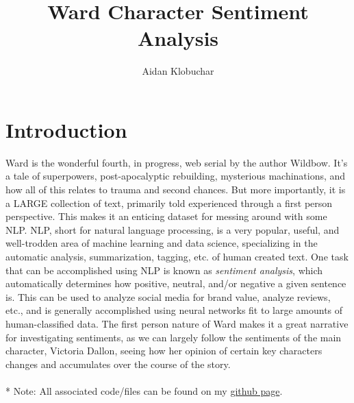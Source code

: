 \documentclass[11pt]{article}
\title{Ward Character Sentiment Analysis}
\author{Aidan Klobuchar}
\date{}
\begin{document}
\maketitle
\section{Introduction}
\noindent
Ward is the wonderful fourth, in progress, web serial by the author Wildbow. It's a tale of superpowers, post-apocalyptic rebuilding, mysterious machinations, and how all of this relates to trauma and second chances. But more importantly, it is a LARGE collection of text, primarily told experienced through a first person perspective. This makes it an enticing dataset for messing around with some NLP. NLP, short for natural language processing, is a very popular, useful, and well-trodden area of machine learning and data science, specializing in the automatic analysis, summarization, tagging, etc. of human created text. One task that can be accomplished using NLP is known as \emph{sentiment analysis}, which automatically determines how positive, neutral, and/or negative a given sentence is. This can be used to analyze social media for brand value, analyze reviews, etc., and is generally accomplished using neural networks fit to large amounts of human-classified data. The first person nature of Ward makes it a great narrative for investigating sentiments, as we can largely follow the sentiments of the main character, Victoria Dallon, seeing how her opinion of certain key characters changes and accumulates over the course of the story.
\\
\\*
Note: All associated code/files can be found on my \href{https://github.com/machinegungeek/Ward-Sentiment-Analysis}{github page}. 
\end{document}

